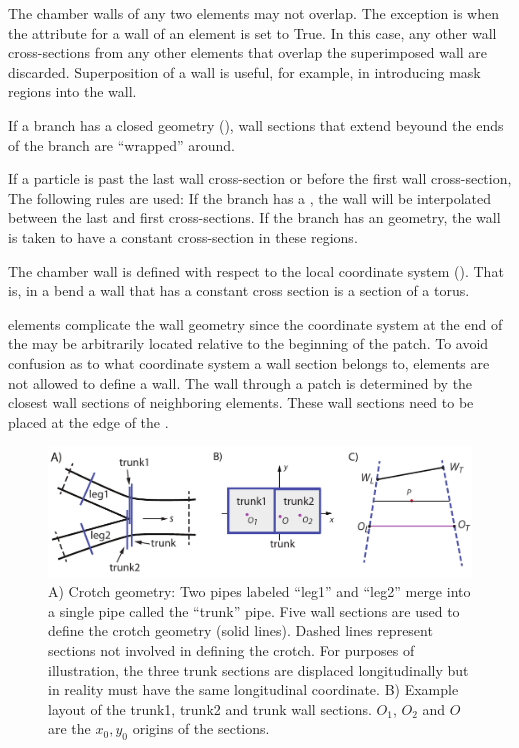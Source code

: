 The chamber walls of any two elements may not overlap. The exception
is when the  attribute for a wall of an element is set
to True. In this case, any other wall cross-sections from any other
elements that overlap the superimposed wall are discarded.
Superposition of a wall is useful, for example, in introducing mask
regions into the wall.

If a branch has a closed geometry (), wall sections that
extend beyound the ends of the branch are ``wrapped'' around.

If a particle is past the last wall cross-section or before the first
wall cross-section, The following rules are used: If the branch has a
, the wall will be interpolated between the last
and first cross-sections. If the branch has an  geometry, the
wall is taken to have a constant cross-section in these regions. 

The chamber wall is defined with respect to the local coordinate
system (). That is, in a bend a wall that has a constant
cross section is a section of a torus.

 elements complicate the wall geometry since the coordinate
system at the end of the  may be arbitrarily located
relative to the beginning of the patch. To avoid confusion as to what
coordinate system a wall section belongs to,  elements are
not allowed to define a wall. The wall through a patch is determined
by the closest wall sections of neighboring elements. These wall
sections need to be placed at the edge of the .


\begin{figure}[tb]
  \centering
  \includegraphics[width=6in]{crotch.pdf}
  \caption[vacuum chamber crotch geometry.]
{A) Crotch geometry: Two pipes labeled ``leg1'' and ``leg2'' merge
into a single pipe called the ``trunk'' pipe. Five wall sections are
used to define the crotch geometry (solid lines). Dashed lines
represent sections not involved in defining the crotch. For purposes
of illustration, the three trunk sections are displaced longitudinally
but in reality must have the same longitudinal coordinate.  B) Example
layout of the trunk1, trunk2 and trunk wall sections. $O_1$, $O_2$
and $O$ are the $x_0, y_0$ origins of the sections.}
  \label{f:crotch}
\end{figure}

